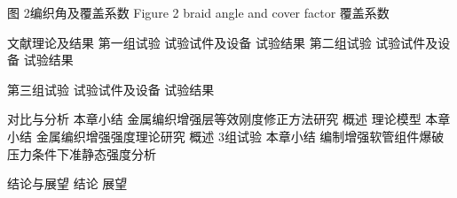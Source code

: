 \documentclass[12pt,a4paper]{book}
\begin{document}
图 2编织角及覆盖系数
Figure 2 braid angle and cover factor
覆盖系数


文献理论及结果
第一组试验
试验试件及设备
试验结果
第二组试验
试验试件及设备
试验结果

第三组试验
试验试件及设备
试验结果

对比与分析
本章小结
金属编织增强层等效刚度修正方法研究
概述
理论模型
本章小结
金属编织增强强度理论研究
概述
3组试验
本章小结
编制增强软管组件爆破压力条件下准静态强度分析

结论与展望
结论
展望

	
	
\end{document}
